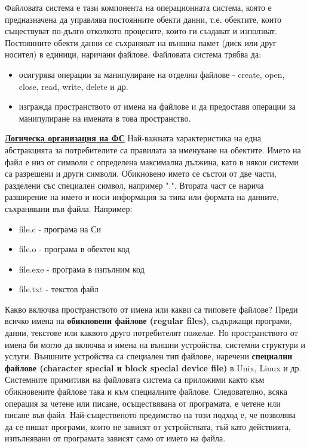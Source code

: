 \documentclass{article}
\begin{document}
Файловата система е тази компонента на операционната система, която е предназначена да управлява постоянните
обекти данни, т.е. обектите, които съществуват по-дълго отколкото процесите, които ги създават и използват.
Постоянните обекти данни се съхраняват на външна памет (диск или друг носител) в единици, наричани файлове.
Файловата система трябва да:
\begin{itemize}
    \item осигурява операции за манипулиране на отделни файлове - create, open, close, read, write, delete и др.
    \item изгражда пространството от имена на файлове и да предоставя операции за манипулиране на имената в това пространство.
\end{itemize}
\textbf{\underline{Логическа организация на ФС}} \newline\newline
Най-важната характеристика на една абстракцията за потребителите са правилата за именуване на обектите. Името на файл е низ от символи с определена максимална дължина, като в някои
системи са разрешени и други символи. Обикновено името се състои от две части, разделени със специален символ, например ".". Втората част се нарича разширение на името и носи
информация за типа или формата на данните, съхранявани във файла. Например:
\begin{itemize}
    \item file.c - програма на Си
    \item file.o - програма в обектен код
    \item file.exe - програма в изпълним код
    \item file.txt - текстов файл
\end{itemize}
Какво включва пространството от имена или какви са типовете файлове? Преди всичко имена на \textbf{обикновени файлове
(regular files)}, съдържащи програми, данни, текстове или каквото друго потребителят пожелае.
Но пространството от имена би могло да включва и имена на външни устройства, системни структури и услуги.
Външните устройства са специален тип файлове, наречени \textbf{специални файлове (character special и block special device file)} в Unix, Linux и др.
Системните примитиви на файловата система са приложими както към обикновените файлове така и към
специалните файлове. Следователно, всяка операция за четене или писане, осъществявана от програмата, е
четене или писане във файл. Най-същественото предимство на този подход е, че позволява да се пишат програми,
които не зависят от устройствата, тъй като действията, изпълнявани от програмата зависят само от името на файла.
\end{document}
